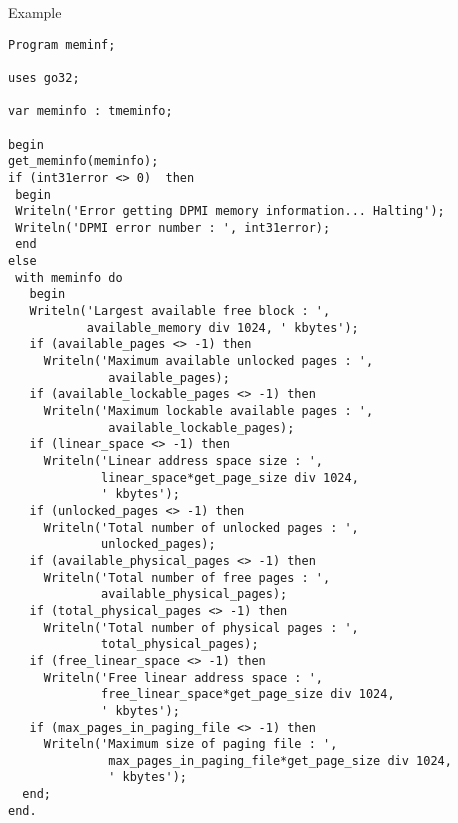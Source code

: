 \begin{FPCList}
\item[Example]
\begin{verbatim}
Program meminf;

uses go32;

var meminfo : tmeminfo;

begin
get_meminfo(meminfo);
if (int31error <> 0)  then 
 begin
 Writeln('Error getting DPMI memory information... Halting');
 Writeln('DPMI error number : ', int31error);
 end 
else 
 with meminfo do 
   begin
   Writeln('Largest available free block : ', 
           available_memory div 1024, ' kbytes');
   if (available_pages <> -1) then
     Writeln('Maximum available unlocked pages : ', 
              available_pages);
   if (available_lockable_pages <> -1) then
     Writeln('Maximum lockable available pages : ', 
              available_lockable_pages);
   if (linear_space <> -1) then
     Writeln('Linear address space size : ', 
             linear_space*get_page_size div 1024, 
             ' kbytes');
   if (unlocked_pages <> -1) then
     Writeln('Total number of unlocked pages : ', 
             unlocked_pages);
   if (available_physical_pages <> -1) then
     Writeln('Total number of free pages : ', 
             available_physical_pages);
   if (total_physical_pages <> -1) then
     Writeln('Total number of physical pages : ', 
             total_physical_pages);
   if (free_linear_space <> -1) then
     Writeln('Free linear address space : ', 
             free_linear_space*get_page_size div 1024,
             ' kbytes');
   if (max_pages_in_paging_file <> -1) then
     Writeln('Maximum size of paging file : ', 
              max_pages_in_paging_file*get_page_size div 1024, 
              ' kbytes');
  end;
end.\end{verbatim}
\end{FPCList}